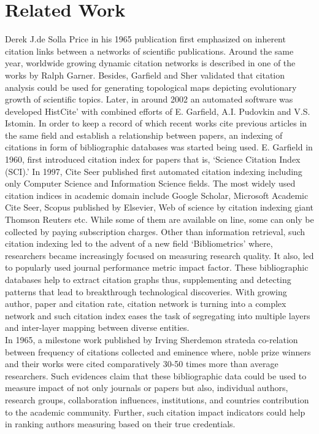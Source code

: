 \section{Related Work}
\label{S:2}
Derek J.de Solla Price in his 1965 publication first emphasized on inherent citation links between a networks of scientific publications. Around the same year, worldwide growing dynamic citation networks is described in one of the works by Ralph Garner. Besides, Garfield and Sher validated that citation analysis could be used for generating topological maps depicting evolutionary growth of scientific topics. Later, in around 2002 an automated software was developed HistCite’ with combined efforts of E. Garfield, A.I. Pudovkin and V.S. Istomin. In order to keep a record of which recent works cite previous articles in the same field and establish a relationship between papers, an indexing of citations in form of bibliographic databases was started being used. E. Garfield in 1960, first introduced citation index for papers that is, ‘Science Citation Index (SCI).’ In 1997, Cite Seer published first automated citation indexing including only Computer Science and Information Science fields. The most widely used citation indices in academic domain include Google Scholar, Microsoft Academic Cite Seer, Scopus published by Elsevier, Web of science by citation indexing giant Thomson Reuters etc. While some of them are available on line, some can only be collected by paying subscription charges. Other than information retrieval, such citation indexing led to the advent of a new field ‘Bibliometrics’ where, researchers became increasingly focused on measuring research quality. It also, led to popularly used journal performance metric impact factor. These bibliographic databases help to extract citation graphs thus, supplementing and detecting patterns that lead to breakthrough technological discoveries. With growing author, paper and citation rate, citation network is turning into a complex network and such citation index eases the task of segregating into multiple layers and inter-layer mapping between diverse entities.\\

In 1965, a milestone work published by Irving Sherdemon strateda co-relation between frequency of citations collected and eminence where, noble prize winners and their works were cited comparatively 30-50 times more than average researchers. Such evidences claim that these bibliographic data could be used to measure impact of not only journals or papers but also, individual authors, research groups, collaboration influences, institutions, and countries contribution to the academic community. Further, such citation impact indicators could help in ranking authors measuring based on their true credentials.\\

